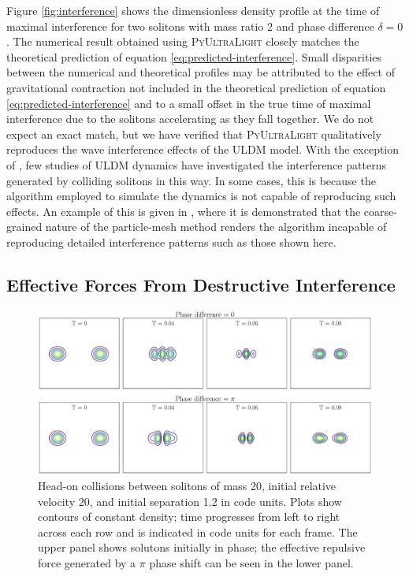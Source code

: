 \documentclass[a4paper,11pt]{article}
\newcommand{\PyUltraLight}{\textsc{PyUltraLight}\xspace}
\begin{document}
 Figure \ref{fig:interference} shows the dimensionless density profile at the time of maximal interference for two solitons with mass ratio 2 and phase difference $\delta=0$. The numerical result obtained using \PyUltraLight closely matches the theoretical prediction of equation \ref{eq:predicted-interference}. Small disparities between the numerical and theoretical profiles may be attributed to the effect of gravitational contraction not included in the theoretical prediction of equation \ref{eq:predicted-interference} and to a small offset in the true time of maximal interference due to the solitons accelerating as they fall together. We do not expect an exact match, but we have verified that \PyUltraLight qualitatively reproduces the wave interference effects of the ULDM model. With the exception of \cite{Schwabe:2016rze}, few studies of ULDM dynamics have investigated the interference patterns generated by colliding solitons in this way. In some cases, this is because the algorithm employed to simulate the dynamics is not capable of reproducing such effects. An example of this is given in \cite{Veltmaat:2016rxo}, where it is demonstrated that the coarse-grained nature of the particle-mesh method renders the algorithm incapable of reproducing detailed interference patterns such as those shown here. 
 
\subsection{Effective Forces From Destructive Interference}

\begin{figure}
  \includegraphics[width=1.\textwidth, trim={0 0 0 0},clip]{phase_comparison}
  \caption{Head-on collisions between solitons of mass 20, initial relative velocity 20, and initial separation 1.2 in code units. Plots show contours of constant density; time progresses from left to right across each row and is indicated in code units for each frame. The upper panel shows solutons initially in phase; the effective repulsive force generated by a $\pi$ phase shift can be seen in the lower panel.}
  \label{fig:repulsion}
\end{figure}
\end{document}
